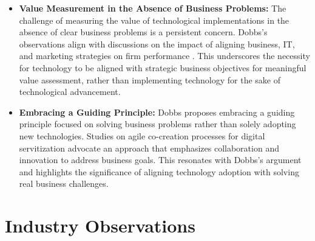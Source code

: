 \documentclass[a4Paper]{article}
\begin{document}
\begin{itemize}
    \item \textbf{Value Measurement in the Absence of Business Problems:} The challenge of measuring the value of technological implementations in the absence of clear business problems is a persistent concern. Dobbs's observations align with discussions on the impact of aligning business, IT, and marketing strategies on firm performance \cite{al2020impact}. This underscores the necessity for technology to be aligned with strategic business objectives for meaningful value assessment, rather than implementing technology for the sake of technological advancement.
    
    \item \textbf{Embracing a Guiding Principle:} Dobbs proposes embracing a guiding principle focused on solving business problems rather than solely adopting new technologies. Studies on agile co-creation processes for digital servitization \cite{sjodin2020agile} advocate an approach that emphasizes collaboration and innovation to address business goals. This resonates with Dobbs's argument and highlights the significance of aligning technology adoption with solving real business challenges.
\end{itemize}

\pagebreak

\section{Industry Observations}
\end{document}
